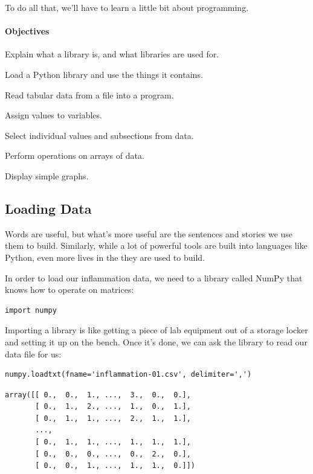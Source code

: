 \documentclass{book}
\begin{document}
To do all that, we'll have to learn a little bit about programming.

\mbox{}\paragraph{Objectives}

\begin{swcitemize}
\item
  Explain what a library is, and what libraries are used for.
\item
  Load a Python library and use the things it contains.
\item
  Read tabular data from a file into a program.
\item
  Assign values to variables.
\item
  Select individual values and subsections from data.
\item
  Perform operations on arrays of data.
\item
  Display simple graphs.
\end{swcitemize}

\subsection{Loading Data}

Words are useful, but what's more useful are the sentences and stories
we use them to build. Similarly, while a lot of powerful tools are built
into languages like Python, even more lives in the
 they are used to build.

In order to load our inflammation data, we need to
 a library called NumPy that knows how to
operate on matrices:

\begin{verbatim}
import numpy
\end{verbatim}

Importing a library is like getting a piece of lab equipment out of a
storage locker and setting it up on the bench. Once it's done, we can
ask the library to read our data file for us:

\begin{verbatim}
numpy.loadtxt(fname='inflammation-01.csv', delimiter=',')
\end{verbatim}

\begin{verbatim}
array([[ 0.,  0.,  1., ...,  3.,  0.,  0.],
       [ 0.,  1.,  2., ...,  1.,  0.,  1.],
       [ 0.,  1.,  1., ...,  2.,  1.,  1.],
       ...,
       [ 0.,  1.,  1., ...,  1.,  1.,  1.],
       [ 0.,  0.,  0., ...,  0.,  2.,  0.],
       [ 0.,  0.,  1., ...,  1.,  1.,  0.]])
\end{verbatim}
\end{document}
